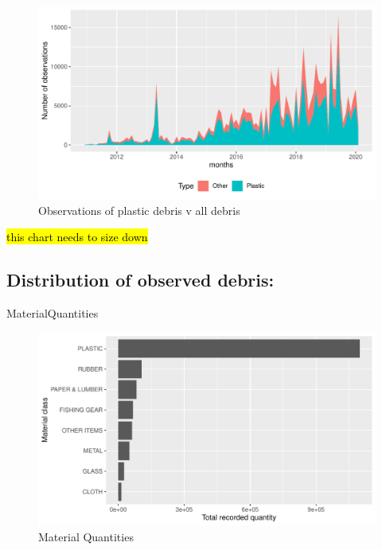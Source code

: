 \documentclass[10pt]{article}\usepackage[]{graphicx}\usepackage[]{color}
\newenvironment{knitrout}{}{} %
\begin{document}
\begin{figure}[H] %
\begin{center}
\begin{knitrout}
\color{fgcolor}
\includegraphics[width=1\linewidth]{figure/unnamed-chunk-10-1} 

\end{knitrout}
\caption {Observations of plastic debris v all debris}
\label{figF}
\end {center}
\end {figure}
\hl{this chart needs to size down}



\subsection {Distribution of observed debris:}

MaterialQuantities\\

\begin{figure}[H] %
\begin{center}
\begin{knitrout}
\color{fgcolor}
\includegraphics[width=1\linewidth]{figure/unnamed-chunk-11-1} 

\end{knitrout}
\caption {Material Quantities}
\label{figC}
\end {center}
\end {figure}
\end{document}
